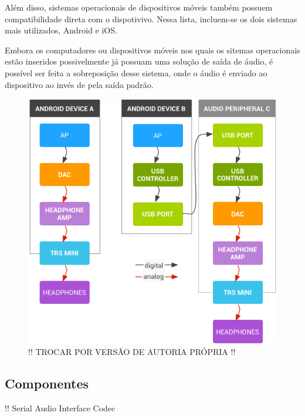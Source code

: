 Além disso, sistemas operacionais de dispositivos móveis também possuem compatibilidade direta com o dispotivivo. Nessa lista, incluem-se os dois sistemas mais utilizados, Android e iOS.

Embora os computadores ou dispositivos móveis nos quais os sitemas operacionais estão inseridos possivelmente já possuam uma solução de saída de áudio, é possível ser feita a sobreposição desse sistema, onde o áudio é enviado ao dispositivo ao invés de pela saída padrão.

\begin{figure}[!h]
  \includegraphics[scale=0.5]{figuras/usb-android-dscs.png}
  \caption{!! TROCAR POR VERSÃO DE AUTORIA PRÓPRIA !!}
  \label{fig:synchronousMode}
\end{figure}


\subsection{Componentes}

!! Serial Audio Interface Codec

